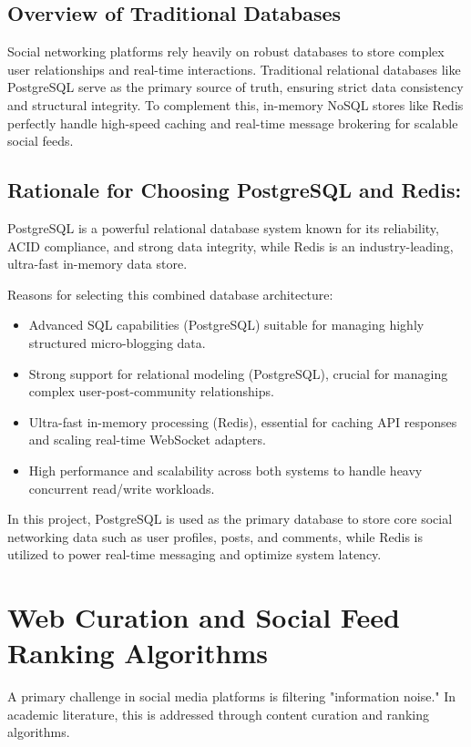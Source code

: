 \subsection{Overview of Traditional Databases}

Social networking platforms rely heavily on robust databases to store complex user relationships and real-time interactions. Traditional relational databases like PostgreSQL serve as the primary source of truth, ensuring strict data consistency and structural integrity. To complement this, in-memory NoSQL stores like Redis perfectly handle high-speed caching and real-time message brokering for scalable social feeds.

\subsection{Rationale for Choosing PostgreSQL and Redis:}

PostgreSQL is a powerful relational database system known for its reliability, ACID compliance, and strong data integrity, while Redis is an industry-leading, ultra-fast in-memory data store.

Reasons for selecting this combined database architecture:
\begin{itemize}
  \item Advanced SQL capabilities (PostgreSQL) suitable for managing highly structured micro-blogging data.
  \item Strong support for relational modeling (PostgreSQL), crucial for managing complex user-post-community relationships.
  \item Ultra-fast in-memory processing (Redis), essential for caching API responses and scaling real-time WebSocket adapters.
  \item High performance and scalability across both systems to handle heavy concurrent read/write workloads.
\end{itemize}

In this project, PostgreSQL is used as the primary database to store core social networking data such as user profiles, posts, and comments, while Redis is utilized to power real-time messaging and optimize system latency.

\section{Web Curation and Social Feed Ranking Algorithms}

A primary challenge in social media platforms is filtering "information noise." In academic literature, this is addressed through content curation and ranking algorithms.

